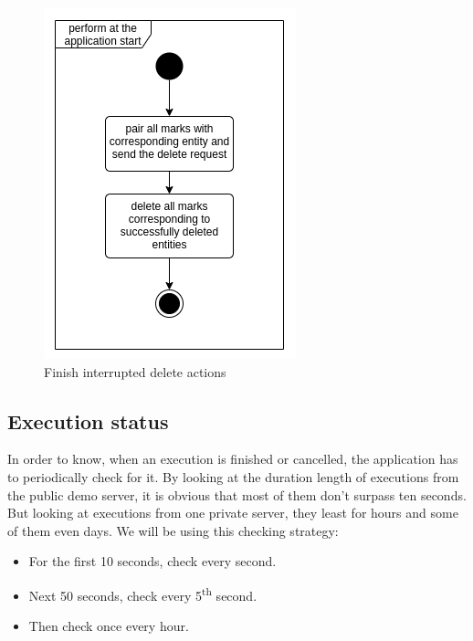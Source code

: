 \begin{figure}
\begin{minipage}[b]{0.45\textwidth}
    	\includegraphics[width=\textwidth]{pics/undo/db_clean.png}
    	\caption[Finish interrupted delete actions]{Finish interrupted delete actions}\label{fig:undoDbClean}
    \end{minipage}
\end{figure}

\subsection{Execution status}
In order to know, when an execution is finished or cancelled, the application has to periodically check for it.
By looking at the duration length of executions from the public demo server, it is obvious that most of them don't surpass ten seconds.
But looking at executions from one private server, they least for hours and some of them even days.
We will be using this checking strategy:
\begin{itemize}
    \item For the first 10 seconds, check every second.
    \item Next 50 seconds, check every 5\textsuperscript{th} second.
    \item Then check once every hour.
\end{itemize}

